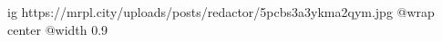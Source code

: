  
 
 
 
 

\ifcmt
  ig https://mrpl.city/uploads/posts/redactor/5pcbs3a3ykma2qym.jpg
  @wrap center
  @width 0.9
\fi
